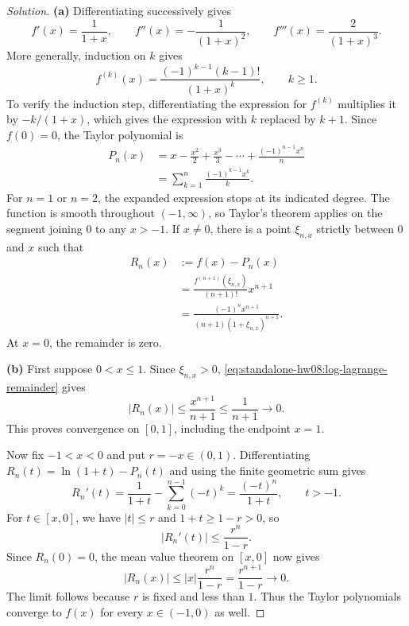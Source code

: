 \documentclass[11pt,letterpaper]{article}
\theoremstyle{definition}
\begin{document}
\begin{proof}[Solution]
  \textbf{(a)} Differentiating successively gives
  \[
    f'(x)=\frac{1}{1+x},\qquad
    f''(x)=-\frac{1}{(1+x)^2},\qquad
    f'''(x)=\frac{2}{(1+x)^3}.
  \]
  More generally, induction on $k$ gives
  \[
    f^{(k)}(x)=\frac{(-1)^{k-1}(k-1)!}{(1+x)^k},
    \qquad k\ge1.
  \]
  To verify the induction step, differentiating the expression for
  $f^{(k)}$ multiplies it by $-k/(1+x)$, which gives the expression
  with $k$ replaced by $k+1$. Since $f(0)=0$, the Taylor polynomial is
  \begin{equation}
    \begin{aligned}
      P_n(x)
        &=x-\frac{x^2}{2}+\frac{x^3}{3}-\cdots
          +\frac{(-1)^{n-1}x^n}{n}\\
        &=\sum_{k=1}^{n}\frac{(-1)^{k-1}x^k}{k}.
    \end{aligned}
    \label{eq:standalone-hw08:log-polynomial}
  \end{equation}
  For $n=1$ or $n=2$, the expanded expression stops at its indicated
  degree. The function is smooth throughout $(-1,\infty)$, so Taylor's
  theorem applies on the segment joining $0$ to any $x>-1$.
  If $x\ne0$, there is a point $\xi_{n,x}$ strictly between $0$ and $x$
  such that
  \begin{equation}
    \begin{aligned}
      R_n(x)
        &:=f(x)-P_n(x)\\
        &=\frac{f^{(n+1)}(\xi_{n,x})}{(n+1)!}x^{n+1}\\
        &=\frac{(-1)^n x^{n+1}}
          {(n+1)(1+\xi_{n,x})^{n+1}}.
    \end{aligned}
    \label{eq:standalone-hw08:log-lagrange-remainder}
  \end{equation}
  At $x=0$, the remainder is zero.

  \textbf{(b)} First suppose $0<x\le1$. Since $\xi_{n,x}>0$,
  \autoref{eq:standalone-hw08:log-lagrange-remainder} gives
  \[
    |R_n(x)|\le\frac{x^{n+1}}{n+1}\le\frac{1}{n+1}\longrightarrow0.
  \]
  This proves convergence on $[0,1]$, including the endpoint $x=1$.

  Now fix $-1<x<0$ and put $r=-x\in(0,1)$. Differentiating
  $R_n(t)=\ln(1+t)-P_n(t)$ and using the finite geometric sum gives
  \[
    R_n'(t)=\frac1{1+t}-\sum_{k=0}^{n-1}(-t)^k
      =\frac{(-t)^n}{1+t},\qquad t>-1.
  \]
  For $t\in[x,0]$, we have $|t|\le r$ and $1+t\ge1-r>0$, so
  \[
    |R_n'(t)|\le\frac{r^n}{1-r}.
  \]
  Since $R_n(0)=0$, the mean value theorem on $[x,0]$ now gives
  \[
    |R_n(x)|\le |x|\frac{r^n}{1-r}
      =\frac{r^{n+1}}{1-r}\longrightarrow0.
  \]
  The limit follows because $r$ is fixed and less than $1$. Thus the
  Taylor polynomials converge to $f(x)$ for every $x\in(-1,0)$ as well.


\end{proof}
\end{document}
